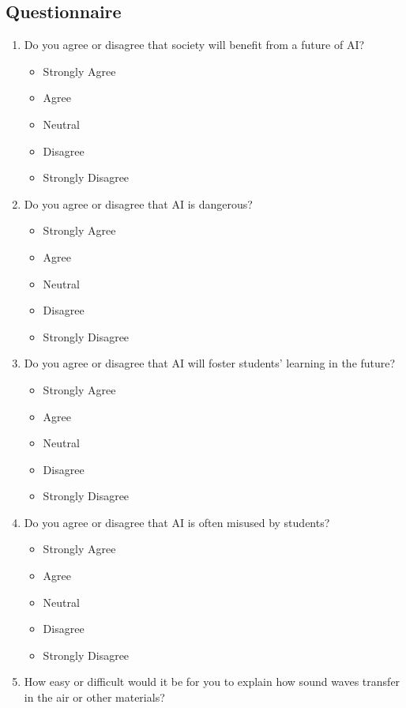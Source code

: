 \documentclass[
  12pt, %
]{article}
\providecommand{\tightlist}{%
  \setlength{\itemsep}{0pt}\setlength{\parskip}{0pt}}
\begin{document}
\newpage

\subsection{Questionnaire}\label{sec:questionnaire}

\begin{enumerate}
\def\labelenumi{\arabic{enumi}.}
\item
  Do you agree or disagree that society will benefit from a future of AI?

  \begin{itemize}
  \tightlist
  \item
    Strongly Agree
  \item
    Agree
  \item
    Neutral
  \item
    Disagree
  \item
    Strongly Disagree
  \end{itemize}
\item
  Do you agree or disagree that AI is dangerous?

  \begin{itemize}
  \tightlist
  \item
    Strongly Agree
  \item
    Agree
  \item
    Neutral
  \item
    Disagree
  \item
    Strongly Disagree
  \end{itemize}
\item
  Do you agree or disagree that AI will foster students' learning in the future?

  \begin{itemize}
  \tightlist
  \item
    Strongly Agree
  \item
    Agree
  \item
    Neutral
  \item
    Disagree
  \item
    Strongly Disagree
  \end{itemize}
\item
  Do you agree or disagree that AI is often misused by students?

  \begin{itemize}
  \tightlist
  \item
    Strongly Agree
  \item
    Agree
  \item
    Neutral
  \item
    Disagree
  \item
    Strongly Disagree
  \end{itemize}
\item
  How easy or difficult would it be for you to explain how sound waves transfer in the air or other materials?


\end{enumerate}
\end{document}
